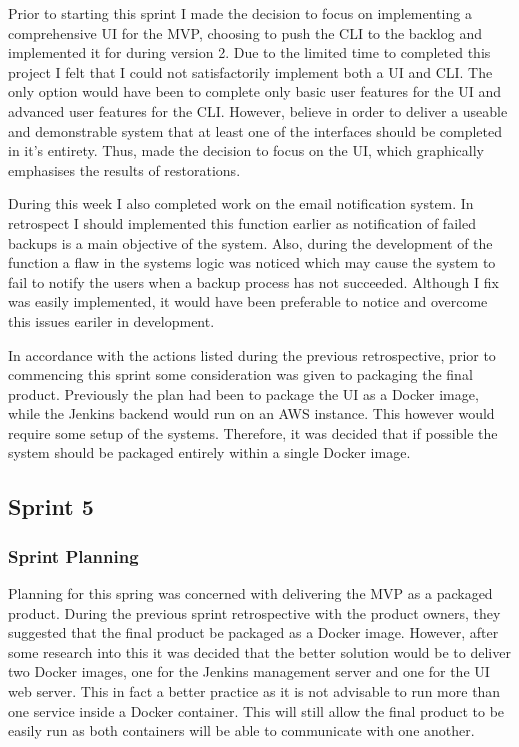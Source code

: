     Prior to starting this sprint I made the decision to focus on implementing a comprehensive UI for the MVP, choosing to push the CLI to the backlog and implemented it for during version 2. Due to the limited time to completed this project I felt that I could not satisfactorily implement both a UI and CLI. The only option would have been to complete only basic user features for the UI and advanced user features for the CLI. However, believe in order to deliver a useable and demonstrable system that at least one of the interfaces should be completed in it's entirety. Thus, made the decision to focus on the UI, which graphically emphasises the results of restorations. 
   
    During this week I also completed work on the email notification system. In retrospect I should implemented this function earlier as notification of failed backups is a main objective of the system. Also, during the development of the function a flaw in the systems logic was noticed which may cause the system to fail to notify the users when a backup process has not succeeded. Although I fix was easily implemented, it would have been preferable to notice and overcome this issues eariler in development.
    
   In accordance with the actions listed during the previous retrospective, prior to commencing this sprint some consideration was given to packaging the final product. Previously the plan had been to package the UI as a Docker image, while the Jenkins backend would run on an AWS instance. This however would require some setup of the systems. Therefore, it was decided that if possible the system should be packaged entirely within a single Docker image.
   
	\subsection{Sprint 5}
  \subsubsection{Sprint Planning}
  Planning for this spring was concerned with delivering the MVP as a packaged product. During the previous sprint retrospective with the product owners, they suggested that the final product be packaged as a Docker image. However, after some research into this it was decided that the better solution would be to deliver two Docker images, one for the Jenkins management server and one for the UI web server. This in fact a better practice as it is not advisable to run more than one service inside a Docker container. This will still allow the final product to be easily run as both containers will be able to communicate with one another.
  
